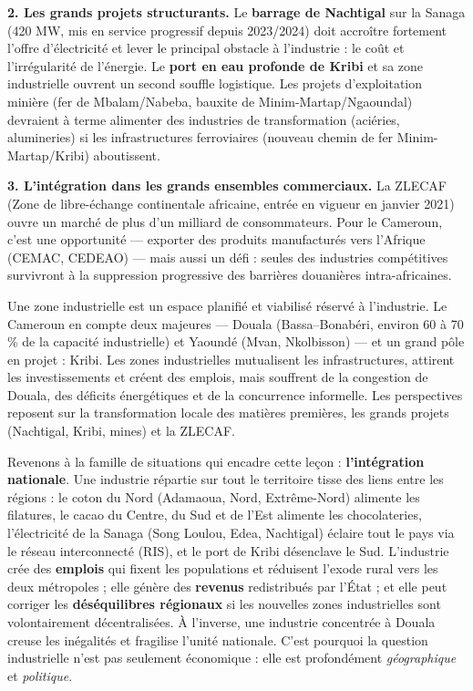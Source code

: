 \documentclass[11pt]{article}
\newcommand{\cle}[1]{{\popxbold\color{popdark}#1}}
\newcounter{popsec}
\newcounter{popsub}
\newcommand{\courssub}[1]{%
  \stepcounter{popsub}%
  \par\vspace{9pt}\noindent{\popxbold\fontsize{11.5}{13}\selectfont\color{popink}{\color{poporange}\thepopsec.\thepopsub}\hspace{6pt}#1}\par\nopagebreak\vspace{4pt}
}
\begin{document}
\textbf{2. Les grands projets structurants.} Le \textbf{barrage de Nachtigal} sur la Sanaga (420 MW, mis en service progressif depuis 2023/2024) doit accroître fortement l'offre d'électricité et lever le principal obstacle à l'industrie : le coût et l'irrégularité de l'énergie. Le \textbf{port en eau profonde de Kribi} et sa zone industrielle ouvrent un second souffle logistique. Les projets d'exploitation minière (fer de Mbalam/Nabeba, bauxite de Minim-Martap/Ngaoundal) devraient à terme alimenter des industries de transformation (aciéries, alumineries) si les infrastructures ferroviaires (nouveau chemin de fer Minim-Martap/Kribi) aboutissent.

\textbf{3. L'intégration dans les grands ensembles commerciaux.} La \cle{ZLECAF} (Zone de libre-échange continentale africaine, entrée en vigueur en janvier 2021) ouvre un marché de plus d'un milliard de consommateurs. Pour le Cameroun, c'est une opportunité — exporter des produits manufacturés vers l'Afrique (CEMAC, CEDEAO) — mais aussi un défi : seules des industries compétitives survivront à la suppression progressive des barrières douanières intra-africaines.

\begin{aretenir}
Une zone industrielle est un espace planifié et viabilisé réservé à l'industrie. Le Cameroun en compte deux majeures — Douala (Bassa--Bonabéri, environ 60 à 70 \% de la capacité industrielle) et Yaoundé (Mvan, Nkolbisson) — et un grand pôle en projet : Kribi. Les zones industrielles mutualisent les infrastructures, attirent les investissements et créent des emplois, mais souffrent de la congestion de Douala, des déficits énergétiques et de la concurrence informelle. Les perspectives reposent sur la transformation locale des matières premières, les grands projets (Nachtigal, Kribi, mines) et la ZLECAF.
\end{aretenir}

\courssub{L'industrie, levier d'intégration nationale}

Revenons à la famille de situations qui encadre cette leçon : \textbf{l'intégration nationale}. Une industrie répartie sur tout le territoire tisse des liens entre les régions : le coton du Nord (Adamaoua, Nord, Extrême-Nord) alimente les filatures, le cacao du Centre, du Sud et de l'Est alimente les chocolateries, l'électricité de la Sanaga (Song Loulou, Edea, Nachtigal) éclaire tout le pays via le réseau interconnecté (RIS), et le port de Kribi désenclave le Sud. L'industrie crée des \textbf{emplois} qui fixent les populations et réduisent l'exode rural vers les deux métropoles ; elle génère des \textbf{revenus} redistribués par l'État ; et elle peut corriger les \textbf{déséquilibres régionaux} si les nouvelles zones industrielles sont volontairement décentralisées. À l'inverse, une industrie concentrée à Douala creuse les inégalités et fragilise l'unité nationale. C'est pourquoi la question industrielle n'est pas seulement économique : elle est profondément \emph{géographique} et \emph{politique}.
\end{document}
